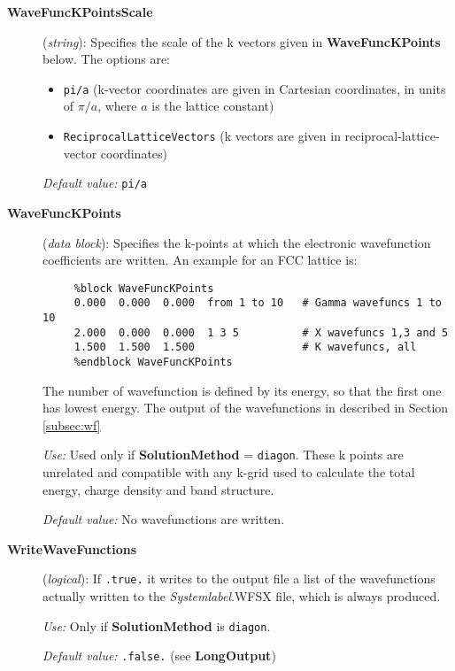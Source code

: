 \documentclass[11pt]{article}
\begin{document}
\begin{description}

\item[{\bf WaveFuncKPointsScale}] ({\it string}):
Specifies the scale of the k vectors given in
{\bf WaveFuncKPoints} below.
The options are:
\begin{itemize}
\item {\tt pi/a} (k-vector coordinates are given in Cartesian
coordinates, in units of $\pi/a$, where $a$ is the lattice constant)
\item {\tt ReciprocalLatticeVectors} (k vectors are given in
reciprocal-lattice-vector coordinates)
\end{itemize}

{\it Default value:} {\tt pi/a}


\item[{\bf WaveFuncKPoints}] ({\it data block}):
Specifies the k-points at which the electronic wavefunction
coefficients are written.
An example for an FCC lattice is:

\begin{verbatim}
     %block WaveFuncKPoints
     0.000  0.000  0.000  from 1 to 10   # Gamma wavefuncs 1 to 10
     2.000  0.000  0.000  1 3 5          # X wavefuncs 1,3 and 5
     1.500  1.500  1.500                 # K wavefuncs, all
     %endblock WaveFuncKPoints
\end{verbatim}

The number of wavefunction is defined by its energy, so that the
first one has lowest energy.
The output of the wavefunctions in described in Section \ref{subsec:wf}

{\it Use:} Used only if {\bf SolutionMethod} = {\tt diagon}.
These k points are unrelated and compatible with any k-grid used
to calculate the total energy,  charge density and band structure.

{\it Default value:} No wavefunctions are written.

\item[{\bf WriteWaveFunctions}] ({\it logical}):
   If {\tt .true.} it writes to the
  output file a list of the wavefunctions actually written to the
{\it Systemlabel}.WFSX file, which is always produced.

{\it Use:} Only if {\bf SolutionMethod} is {\tt diagon}.

{\it Default value:} {\tt .false.} (see {\bf LongOutput})


\end{description}
\end{document}
